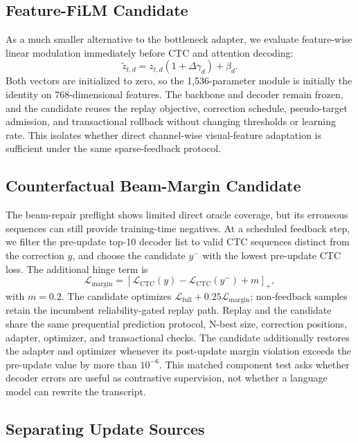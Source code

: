 \subsection{Feature-FiLM Candidate}

As a much smaller alternative to the bottleneck adapter, we evaluate feature-wise linear modulation immediately before CTC and attention decoding:
\begin{equation}
  \widetilde z_{t,d}=z_{t,d}(1+\Delta\gamma_d)+\beta_d.
\end{equation}
Both vectors are initialized to zero, so the 1,536-parameter module is initially the identity on 768-dimensional features. The backbone and decoder remain frozen, and the candidate reuses the replay objective, correction schedule, pseudo-target admission, and transactional rollback without changing thresholds or learning rate. This isolates whether direct channel-wise visual-feature adaptation is sufficient under the same sparse-feedback protocol.

\subsection{Counterfactual Beam-Margin Candidate}

The beam-repair preflight shows limited direct oracle coverage, but its erroneous sequences can still provide training-time negatives. At a scheduled feedback step, we filter the pre-update top-10 decoder list to valid CTC sequences distinct from the correction $y$, and choose the candidate $y^{-}$ with the lowest pre-update CTC loss. The additional hinge term is
\begin{equation}
  \mathcal L_{\mathrm{margin}}=
  \left[\mathcal L_{\mathrm{CTC}}(y)-\mathcal L_{\mathrm{CTC}}(y^{-})+m\right]_{+},
\end{equation}
with $m=0.2$. The candidate optimizes $\mathcal L_{\mathrm{full}}+0.25\mathcal L_{\mathrm{margin}}$; non-feedback samples retain the incumbent reliability-gated replay path. Replay and the candidate share the same prequential prediction protocol, N-best size, correction positions, adapter, optimizer, and transactional checks. The candidate additionally restores the adapter and optimizer whenever its post-update margin violation exceeds the pre-update value by more than $10^{-6}$. This matched component test asks whether decoder errors are useful as contrastive supervision, not whether a language model can rewrite the transcript.

\subsection{Separating Update Sources}

